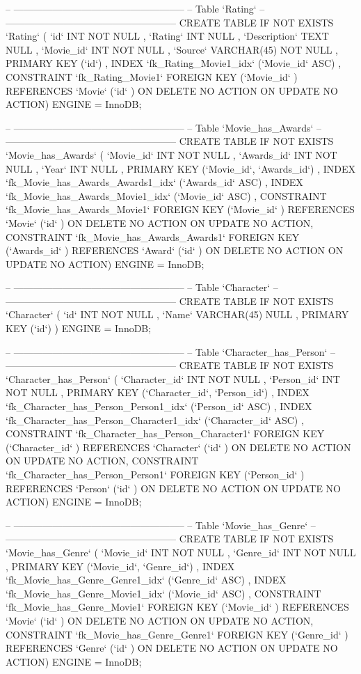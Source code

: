 \begin{spverbatim}
-- -----------------------------------------------------
-- Table `Rating`
-- -----------------------------------------------------
CREATE  TABLE IF NOT EXISTS `Rating` (
  `id` INT NOT NULL ,
  `Rating` INT NULL ,
  `Description` TEXT NULL ,
  `Movie_id` INT NOT NULL ,
  `Source` VARCHAR(45) NOT NULL ,
  PRIMARY KEY (`id`) ,
  INDEX `fk_Rating_Movie1_idx` (`Movie_id` ASC) ,
  CONSTRAINT `fk_Rating_Movie1`
    FOREIGN KEY (`Movie_id` )
    REFERENCES `Movie` (`id` )
    ON DELETE NO ACTION
    ON UPDATE NO ACTION)
ENGINE = InnoDB;


-- -----------------------------------------------------
-- Table `Movie_has_Awards`
-- -----------------------------------------------------
CREATE  TABLE IF NOT EXISTS `Movie_has_Awards` (
  `Movie_id` INT NOT NULL ,
  `Awards_id` INT NOT NULL ,
  `Year` INT NULL ,
  PRIMARY KEY (`Movie_id`, `Awards_id`) ,
  INDEX `fk_Movie_has_Awards_Awards1_idx` (`Awards_id` ASC) ,
  INDEX `fk_Movie_has_Awards_Movie1_idx` (`Movie_id` ASC) ,
  CONSTRAINT `fk_Movie_has_Awards_Movie1`
    FOREIGN KEY (`Movie_id` )
    REFERENCES `Movie` (`id` )
    ON DELETE NO ACTION
    ON UPDATE NO ACTION,
  CONSTRAINT `fk_Movie_has_Awards_Awards1`
    FOREIGN KEY (`Awards_id` )
    REFERENCES `Award` (`id` )
    ON DELETE NO ACTION
    ON UPDATE NO ACTION)
ENGINE = InnoDB;


-- -----------------------------------------------------
-- Table `Character`
-- -----------------------------------------------------
CREATE  TABLE IF NOT EXISTS `Character` (
  `id` INT NOT NULL ,
  `Name` VARCHAR(45) NULL ,
  PRIMARY KEY (`id`) )
ENGINE = InnoDB;


-- -----------------------------------------------------
-- Table `Character_has_Person`
-- -----------------------------------------------------
CREATE  TABLE IF NOT EXISTS `Character_has_Person` (
  `Character_id` INT NOT NULL ,
  `Person_id` INT NOT NULL ,
  PRIMARY KEY (`Character_id`, `Person_id`) ,
  INDEX `fk_Character_has_Person_Person1_idx` (`Person_id` ASC) ,
  INDEX `fk_Character_has_Person_Character1_idx` (`Character_id` ASC) ,
  CONSTRAINT `fk_Character_has_Person_Character1`
    FOREIGN KEY (`Character_id` )
    REFERENCES `Character` (`id` )
    ON DELETE NO ACTION
    ON UPDATE NO ACTION,
  CONSTRAINT `fk_Character_has_Person_Person1`
    FOREIGN KEY (`Person_id` )
    REFERENCES `Person` (`id` )
    ON DELETE NO ACTION
    ON UPDATE NO ACTION)
ENGINE = InnoDB;


-- -----------------------------------------------------
-- Table `Movie_has_Genre`
-- -----------------------------------------------------
CREATE  TABLE IF NOT EXISTS `Movie_has_Genre` (
  `Movie_id` INT NOT NULL ,
  `Genre_id` INT NOT NULL ,
  PRIMARY KEY (`Movie_id`, `Genre_id`) ,
  INDEX `fk_Movie_has_Genre_Genre1_idx` (`Genre_id` ASC) ,
  INDEX `fk_Movie_has_Genre_Movie1_idx` (`Movie_id` ASC) ,
  CONSTRAINT `fk_Movie_has_Genre_Movie1`
    FOREIGN KEY (`Movie_id` )
    REFERENCES `Movie` (`id` )
    ON DELETE NO ACTION
    ON UPDATE NO ACTION,
  CONSTRAINT `fk_Movie_has_Genre_Genre1`
    FOREIGN KEY (`Genre_id` )
    REFERENCES `Genre` (`id` )
    ON DELETE NO ACTION
    ON UPDATE NO ACTION)
ENGINE = InnoDB;



\end{spverbatim}
